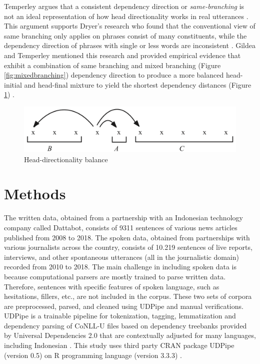 \documentclass[10pt, a4paper, conference, compsocconf]{IEEEtran}
\begin{document}
Temperley argues that a consistent dependency direction or \textit{same-branching} is not an ideal representation of how head directionality works in real utterances \cite{temperley2008dependency}. This argument supports Dryer's research who found that the conventional view of same branching only applies on phrases consist of many constituents, while the dependency direction of phrases with single or less words are inconsistent \cite{dryer1992greenbergian}. Gildea and Temperley mentioned this research and provided empirical evidence that exhibit a combination of same branching and mixed branching (Figure \ref{fig:mixedbranching}) dependency direction to produce a more balanced head-initial and head-final mixture to yield the shortest dependency distances (Figure \ref{fig:balancedbranching}) \cite{gildea2010grammars}.

\begin{figure}
	\centering \includegraphics[width=0.45
	\textwidth] {pics/balancedbranching.png} \caption{Head-directionality balance \cite{temperley2008dependency}} 
\label{fig:balancedbranching} \end{figure}

\section{Methods}

The written data, obtained from a partnership with an Indonesian technology company called Dattabot, consists of 9311 sentences of various news articles published from 2008 to 2018. The spoken data, obtained from partnerships with various journalists across the country, consists of 10.219 sentences of live reports, interviews, and other spontaneous utterances (all in the journalistic domain) recorded from 2010 to 2018. The main challenge in including spoken data is because computational parsers are mostly trained to parse written data. Therefore, sentences with specific features of spoken language, such as hesitations, fillers, etc., are not included in the corpus. These two sets of corpora are preprocessed, parsed, and cleaned using UDPipe \cite{udpipe2017} and manual verifications. UDPipe is a trainable pipeline for tokenization, tagging, lemmatization and dependency parsing of CoNLL-U files based on dependency treebanks provided by Universal Dependencies 2.0 that are contextually adjusted for many languages, including Indonesian \cite{udpipe2017, nivre2017universal}. This study uses third party CRAN package UDPipe (version 0.5) on R programming language (version 3.3.3) \cite{udpipe2017manual, r2017project}.
\end{document}
